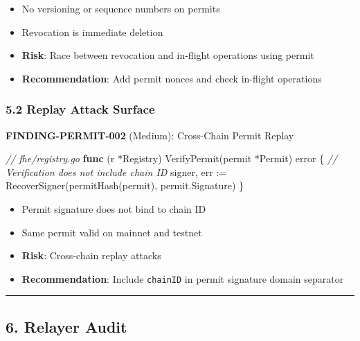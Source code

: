 \documentclass[
]{article}
\newenvironment{Shaded}{}{}
\newcommand{\CommentTok}[1]{\textcolor[rgb]{0.38,0.63,0.69}{\textit{#1}}}
\newcommand{\DataTypeTok}[1]{\textcolor[rgb]{0.56,0.13,0.00}{#1}}
\newcommand{\KeywordTok}[1]{\textcolor[rgb]{0.00,0.44,0.13}{\textbf{#1}}}
\newcommand{\NormalTok}[1]{#1}
\newcommand{\OperatorTok}[1]{\textcolor[rgb]{0.40,0.40,0.40}{#1}}
\providecommand{\tightlist}{%
  \setlength{\itemsep}{0pt}\setlength{\parskip}{0pt}}
\begin{document}
\begin{itemize}
\tightlist
\item
  No versioning or sequence numbers on permits
\item
  Revocation is immediate deletion
\item
  \textbf{Risk}: Race between revocation and in-flight operations using
  permit
\item
  \textbf{Recommendation}: Add permit nonces and check in-flight
  operations
\end{itemize}

\subsubsection{5.2 Replay Attack
Surface}\label{52-replay-attack-surface}

\textbf{FINDING-PERMIT-002} (Medium): Cross-Chain Permit Replay

\begin{Shaded}
\begin{Highlighting}[]
\CommentTok{// fhe/registry.go}
\KeywordTok{func} \OperatorTok{(}\NormalTok{r }\OperatorTok{*}\NormalTok{Registry}\OperatorTok{)}\NormalTok{ VerifyPermit}\OperatorTok{(}\NormalTok{permit }\OperatorTok{*}\NormalTok{Permit}\OperatorTok{)} \DataTypeTok{error} \OperatorTok{\{}
    \CommentTok{// Verification does not include chain ID}
\NormalTok{    signer}\OperatorTok{,}\NormalTok{ err }\OperatorTok{:=}\NormalTok{ RecoverSigner}\OperatorTok{(}\NormalTok{permitHash}\OperatorTok{(}\NormalTok{permit}\OperatorTok{),}\NormalTok{ permit}\OperatorTok{.}\NormalTok{Signature}\OperatorTok{)}
\OperatorTok{\}}
\end{Highlighting}
\end{Shaded}

\begin{itemize}
\tightlist
\item
  Permit signature does not bind to chain ID
\item
  Same permit valid on mainnet and testnet
\item
  \textbf{Risk}: Cross-chain replay attacks
\item
  \textbf{Recommendation}: Include \texttt{chainID} in permit signature
  domain separator
\end{itemize}

\begin{center}\rule{0.5\linewidth}{0.5pt}\end{center}

\subsection{6. Relayer Audit}\label{6-relayer-audit}
\end{document}
